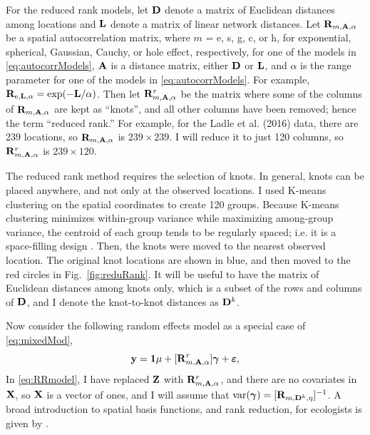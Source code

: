 \documentclass[11pt, titlepage]{article}\usepackage[]{graphicx}\usepackage[]{color}
\begin{document}
\begin{spacing}{1.9}
\begin{flushleft}
 For the reduced rank models, let $\mathbf{D}$ denote a matrix of Euclidean distances among locations and $\mathbf{L}$ denote a matrix of linear network distances. Let $\mathbf{R}_{m,\mathbf{A},\alpha}$ be a spatial autocorrelation matrix, where $m$ = e, s, g, c, or h, for exponential, spherical, Gaussian, Cauchy, or hole effect, respectively, for one of the models in \ref{eq:autocorrModels}, $\mathbf{A}$ is a distance matrix, either $\mathbf{D}$ or $\mathbf{L}$, and $\alpha$ is the range parameter for one of the models in \ref{eq:autocorrModels}.  For example, $\mathbf{R}_{\textrm{e},\mathbf{L},\alpha} = \exp(-\mathbf{L}/\alpha)$.  Then let $\mathbf{R}^r_{m,\mathbf{A},\alpha}$ be the matrix where some of the columns of $\mathbf{R}_{m,\mathbf{A},\alpha}$ are kept as ``knots'', and all other columns have been removed; hence the term ``reduced rank.''  For example, for the Ladle et al. (2016) data, there are 239 locations, so $\mathbf{R}_{m,\mathbf{A},\alpha}$ is $239 \times 239$. I will reduce it to just 120 columns, so $\mathbf{R}^r_{m,\mathbf{A},\alpha}$ is $239 \times 120$.  

The reduced rank method requires the selection of knots.  In general, knots can be placed anywhere, and not only at the observed locations.  I used K-means clustering \citep{MacQ:some:1967} on the spatial coordinates to create 120 groups. Because K-means clustering minimizes within-group variance while maximizing among-group variance, the centroid of each group tends to be regularly spaced; i.e. it is a space-filling design \citep[e.g.][]{Ver:Jans:esti:2015}.  Then, the knots were moved to the nearest observed location. The original knot locations are shown in blue, and then moved to the red circles in Fig.~\ref{fig:reduRank}.  It will be useful to have the matrix of Euclidean distances among knots only, which is a subset of the rows and columns of $\mathbf{D}$, and I denote the knot-to-knot distances as $\mathbf{D}^k$. 

Now consider the following random effects model as a special case of \ref{eq:mixedMod},
\begin{equation} \label{eq:RRmodel}
	\mathbf{y} = \mathbf{1}\mu + [\mathbf{R}^r_{m,\mathbf{A},\alpha}]\mbox{\boldmath $\gamma$} + \mbox{\boldmath $\varepsilon$},
\end{equation}
In \ref{eq:RRmodel}, I have replaced $\mathbf{Z}$ with $\mathbf{R}_{m,\mathbf{A},\alpha}^r$, and there are no covariates in $\mathbf{X}$, so $\mathbf{X}$ is a vector of ones, and I will assume that $\textrm{var}(\mbox{\boldmath $\gamma$})=[\mathbf{R}_{m,\mathbf{D}^k,\eta}]^{-1}$.  A broad introduction to spatial basis functions, and rank reduction, for ecologists is given by \citet{Hefl:Brom:Bros:Bude:basi:2016}.


\end{flushleft}
\end{spacing}
\end{document}
